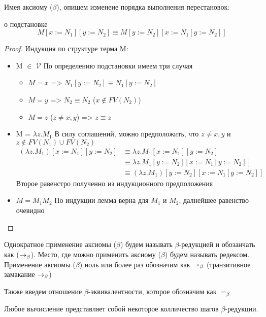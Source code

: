 \documentclass[lambda.tex]{subfiles}
\begin{document}
Имея аксиому ($\beta$), опишем изменеие порядка выполнения перестановок:
\begin{lemma}{о подстановке}
\begin{equation*}
	M[x := N_1][y := N_2] \equiv M[y := N_2][x := N_1[y := N_2]]
\end{equation*}
\end{lemma}
\begin{proof}
	Индукция по структуре терма M: \\
	\begin{itemize}
		\item M $\in$ $\mathcal{V}$ По определению подстановки имеем три случая
		\begin{itemize}
		 	\item $M = x$ => $N_1[y := N_2] \equiv N_1[y := N_2]$
		 	\item $M = y$ => $N_2 \equiv N_2$ ($x\not\in FV(N_2)$)
		 	\item $M = z$ ($z \neq x, y$) => $z \equiv z$
		 \end{itemize}
		 \item M = $\lambda z.M_1$
		 В силу соглашений, можно предположить, что $z \neq x,y$ и $z\not\in FV(N_1) \cup FV(N_2)$
		 \begin{align*}
		 			 (\lambda z.M_1)[x := N_1][y := N_2] 
		 			 &\equiv \lambda z.M_1[x := N_1][y := N_2]\\
		 			 &\equiv \lambda z.M_1[y := N_2][x := N_1[y := N_2]] \\
		 			 &\equiv (\lambda z.M_1)[y := N_2][x := N_1[y := N_2]]
		 \end{align*}
		 Второе равенстро полученно из индукционного предположения
		 \item $M = M_1 M_2$
		 По индукции лемма верна для $M_1$ и $M_2$, далнейшее равенство очевидно
	\end{itemize}
\end{proof}


Однократное применение аксиомы ($\beta$) будем называть $\beta$-редукцией и обозанчать как ($\rightarrow_\beta$). Место, где можно применить аксиому ($\beta$) будем называть редексом. 
Применение аксиомы ($\beta$) ноль или более раз обозначим как $\twoheadrightarrow_\beta$ (транзитивное замакание $\rightarrow_\beta$)

Также введем отношение $\beta$-эквивалентности, которое обозначим как $=_\beta$

Любое вычисление представляет собой некоторое колличество шагов $\beta$-редукции.
\end{document}
